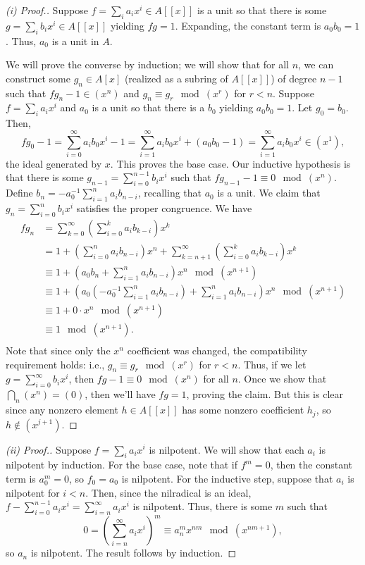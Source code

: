 \begin{proof}[(i) Proof.]
Suppose $f = \sum_i a_i x^i \in A[[x]]$ is a unit so that there is some $g = \sum_i b_ix^i \in A[[x]]$ yielding $fg = 1$. 
Expanding, the constant term is $a_0 b_0 = 1$. Thus, $a_0$ is a unit in $A$. 

We will prove the converse by induction; we will show that for all $n$, we can construct some $g_n \in A[x]$ (realized as a subring of $A[[x]]$) of degree $n-1$ 
such that $fg_n - 1 \in (x^n)$ and $g_n \equiv g_r \mod (x^r)$ for $r < n$. 
Suppose $f = \sum_i a_i x^i$ and $a_0$ is a unit so that there is a $b_0$ yielding $a_0 b_0 = 1$.
Let $g_0 = b_0$. Then, 
$$fg_0 - 1 = \sum_{i=0}^{\infty} a_ib_0 x^i - 1 = \sum_{i=1}^{\infty} a_ib_0 x^i + (a_0b_0 - 1) = \sum_{i=1}^{\infty} a_ib_0 x^i \in (x^1),$$
the ideal generated by $x$. This proves the base case. Our inductive hypothesis is that there is some $g_{n-1} = \sum_{i=0}^{n-1} b_ix^i$ such that 
$fg_{n-1} - 1 \equiv 0 \mod (x^n)$. Define $b_n = - a_0^{-1}\sum_{i=1}^n a_i b_{n-i}$, recalling that $a_0$ is a unit. We claim that $g_n = \sum_{i=0}^n b_i x^i$
satisfies the proper congruence. We have
\begin{align*}
fg_n &= \sum_{k=0}^{\infty} \left(\sum_{i=0}^k a_i b_{k-i} \right) x^k \\
&= 1 + \left(\sum_{i=0}^n a_i b_{n-i} \right)x^n + \sum_{k=n+1}^{\infty} \left(\sum_{i=0}^k a_i b_{k-i} \right) x^k \\
&\equiv 1 + \left(a_0b_n + \sum_{i=1}^n a_i b_{n-i} \right)x^n \mod (x^{n+1}) \\
&\equiv 1 + \left(a_0\left(- a_0^{-1}\sum_{i=1}^n a_i b_{n-i}\right) + \sum_{i=1}^n a_i b_{n-i} \right)x^n \mod (x^{n+1}) \\
&\equiv 1 + 0 \cdot x^n \mod (x^{n+1}) \\
&\equiv 1 \mod (x^{n+1}). \\
\end{align*}
Note that since only the $x^n$ coefficient was changed, the compatibility requirement holds: i.e., $g_n \equiv g_r \mod (x^r)$ for $r < n$. Thus, if we let
$g = \sum_{i=0}^{\infty} b_i x^i$, then $fg - 1 \equiv 0 \mod (x^n)$ for all $n$. Once we show that $\bigcap_n (x^n) = (0)$, then we'll have $fg = 1$, 
proving the claim. But this is clear since any nonzero element $h \in A[[x]]$ has some nonzero coefficient $h_j$, so $h \not\in (x^{j+1})$.
\end{proof}

\begin{proof}[(ii) Proof.]
Suppose $f = \sum_i a_i x^i$ is nilpotent. We will show that each $a_i$ is nilpotent by induction. For the base case, note that if $f^m = 0$, then
the constant term is $a_0^m = 0$, so $f_0 = a_0$ is nilpotent. For the inductive step, suppose that $a_i$ is nilpotent for $i < n$. Then, since the 
nilradical is an ideal, $f - \sum_{i=0}^{n-1} a_i x^i = \sum_{i=n}^{\infty} a_i x^i$ is nilpotent. Thus, there is some $m$ such that
$$0 = \left(\sum_{i=n}^{\infty} a_i x^i\right)^m \equiv a_n^m x^{nm} \mod (x^{nm+1}),$$
so $a_n$ is nilpotent. The result follows by induction.
\end{proof}

